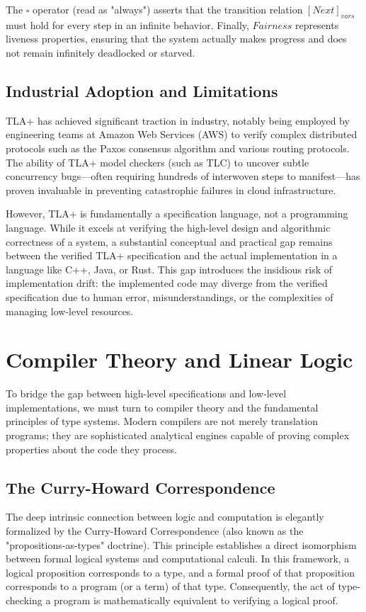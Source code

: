 The $\square$ operator (read as "always") asserts that the transition relation $[Next]_{vars}$ must hold for every step in an infinite behavior. Finally, $Fairness$ represents liveness properties, ensuring that the system actually makes progress and does not remain infinitely deadlocked or starved.

\subsection{Industrial Adoption and Limitations}

TLA+ has achieved significant traction in industry, notably being employed by engineering teams at Amazon Web Services (AWS) to verify complex distributed protocols such as the Paxos consensus algorithm and various routing protocols. The ability of TLA+ model checkers (such as TLC) to uncover subtle concurrency bugs---often requiring hundreds of interwoven steps to manifest---has proven invaluable in preventing catastrophic failures in cloud infrastructure.

However, TLA+ is fundamentally a specification language, not a programming language. While it excels at verifying the high-level design and algorithmic correctness of a system, a substantial conceptual and practical gap remains between the verified TLA+ specification and the actual implementation in a language like C++, Java, or Rust. This gap introduces the insidious risk of implementation drift: the implemented code may diverge from the verified specification due to human error, misunderstandings, or the complexities of managing low-level resources.

\section{Compiler Theory and Linear Logic}

To bridge the gap between high-level specifications and low-level implementations, we must turn to compiler theory and the fundamental principles of type systems. Modern compilers are not merely translation programs; they are sophisticated analytical engines capable of proving complex properties about the code they process.

\subsection{The Curry-Howard Correspondence}

The deep intrinsic connection between logic and computation is elegantly formalized by the Curry-Howard Correspondence (also known as the "propositions-as-types" doctrine). This principle establishes a direct isomorphism between formal logical systems and computational calculi. In this framework, a logical proposition corresponds to a type, and a formal proof of that proposition corresponds to a program (or a term) of that type. Consequently, the act of type-checking a program is mathematically equivalent to verifying a logical proof.

